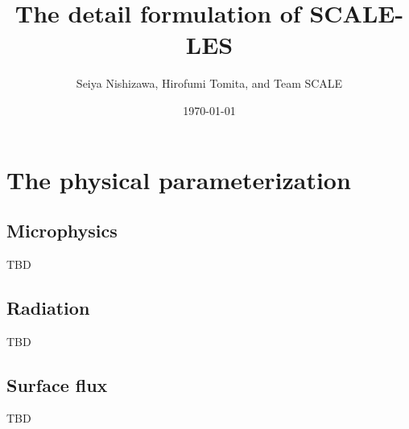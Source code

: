 \documentclass[a4paper]{report}
\title{{\LARGE The detail formulation of SCALE-LES}}
\author{Seiya Nishizawa, Hirofumi Tomita, and Team SCALE}
\date{\today}
\begin{document}
\maketitle
\tableofcontents










\chapter{The physical parameterization}


\section{Microphysics}
{\Huge TBD}

\section{Radiation}
{\Huge TBD}

\section{Surface flux}
{\Huge TBD}




\end{document}
